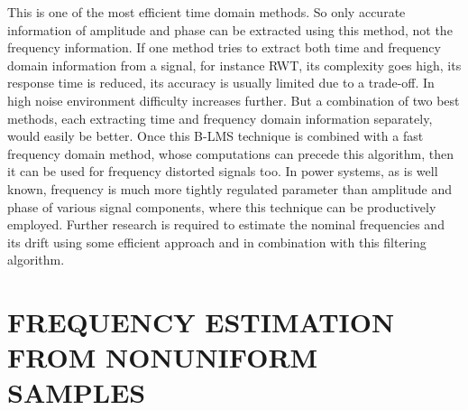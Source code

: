\documentclass{UCF_ETD}
\begin{document}
This is one of the most efficient time domain methods. So only accurate information of amplitude and phase can be extracted using this method, not the frequency information. If one method tries to extract both time and frequency domain information from a signal, for instance RWT, its complexity goes high, its response time is reduced, its accuracy is usually limited due to a trade-off. In high noise environment difficulty increases further. But a combination of two best methods, each extracting time and frequency domain information separately, would easily be better. Once this B-LMS technique is combined with a fast frequency domain method, whose computations can precede this algorithm, then it can be used for frequency distorted signals too. In power systems, as is well known, frequency is much more tightly regulated parameter than amplitude and phase of various signal components, where this technique can be productively employed. Further research is required to estimate the nominal frequencies and its drift using some efficient approach and in combination with this filtering algorithm.



\chapter{FREQUENCY ESTIMATION FROM NONUNIFORM SAMPLES}\label{FreqEst}
\end{document}
